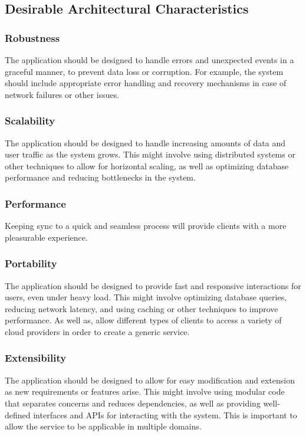 \documentclass[12pt]{article}
\begin{document}
        \subsection{Desirable Architectural Characteristics}
            \subsubsection{Robustness}
            The application should be designed to handle errors and unexpected events in a graceful manner, to prevent data loss or corruption. For example, the system should include appropriate error handling and recovery mechanisms in case of network failures or other issues.
            \subsubsection{Scalability}
            The application should be designed to handle increasing amounts of data and user traffic as the system grows.
            This might involve using distributed systems or other techniques to allow for horizontal scaling, as well as optimizing database performance and reducing bottlenecks in the system.
            \subsubsection{Performance}
            Keeping sync to a quick and seamless process will provide clients with a more pleasurable experience. 
            \subsubsection{Portability}
            The application should be designed to provide fast and responsive interactions for users, even under heavy load.
            This might involve optimizing database queries, reducing network latency, and using caching or other techniques to improve performance.
            As well as, allow different types of clients to access a variety of cloud providers in order to create a generic service. 
            \subsubsection{Extensibility}
            The application should be designed to allow for easy modification and extension as new requirements or features arise.
            This might involve using modular code that separates concerns and reduces dependencies, as well as providing well-defined interfaces and APIs for interacting with the system.
            This is important to allow the service to be applicable in multiple domains.
\end{document}
